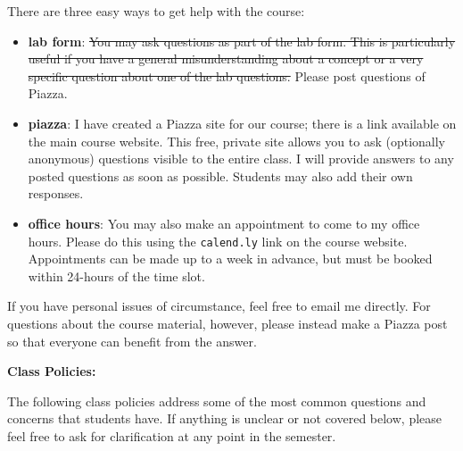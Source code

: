 \documentclass[12pt]{article}
\begin{document}
There are three easy ways to get help with the course:

\begin{itemize}
\item \textbf{lab form}: \sout{You may ask questions as part of the lab form. This
is particularly useful if you have a general misunderstanding about a concept
or a very specific question about one of the lab questions.} Please post questions
of Piazza.
\item \textbf{piazza}: I have created a Piazza site for our course; there is
a link available on the main course website. This free, private site allows
you to ask (optionally anonymous) questions visible to the entire class. I
will provide answers to any posted questions as soon as possible. Students may
also add their own responses.
\item \textbf{office hours}: You may also make an appointment to come to my
office hours. Please do this using the \texttt{calend.ly} link on the course
website. Appointments can be made up to a week in advance, but must be booked
within 24-hours of the time slot.
\end{itemize}

If you have personal issues of circumstance, feel free to email me directly.
For questions about the course material, however, please instead make a Piazza
post so that everyone can benefit from the answer.

\vspace{0.5cm}

\textbf{Class Policies:} \vspace{6pt}

The following class policies address some of the most common questions and
concerns that students have. If anything is unclear or not covered below,
please feel free to ask for clarification at any point in the semester.
\end{document}
